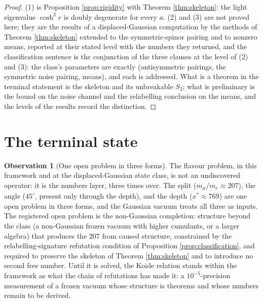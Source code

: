 \documentclass[11pt]{article}
\theoremstyle{definition}
\newtheorem{observation}[theorem]{Observation}
\begin{document}
\begin{proof}
(1) is Proposition \ref{prop:rigidity} with Theorem \ref{thm:skeleton}: the light eigenvalue $\cosh^{2}r$ is doubly degenerate for every $a$. (2) and (3) are not proved here; they are the results of a displaced-Gaussian computation by the methods of Theorem \ref{thm:skeleton} extended to the symmetric-spinor pairing and to nonzero means, reported at their stated level with the numbers they returned, and the classification sentence is the conjunction of the three clauses at the level of (2) and (3): the class's parameters are exactly (antisymmetric pairings, the symmetric noise pairing, means), and each is addressed. What is a theorem in the terminal statement is the skeleton and its unbreakable $S_{2}$; what is preliminary is the bound on the noise channel and the relabelling conclusion on the means, and the levels of the results record the distinction.
\end{proof}

\section{The terminal state}\label{sec:terminal}

\begin{observation}[One open problem in three forms]\label{obs:debt}
The flavour problem, in this framework and at the displaced-Gaussian state class, is not an undiscovered operator: it is the numbers layer, three times over. The split ($m_{\mu}/m_{e} \approx 207$), the angle ($45^{\circ}$, present only through the depth), and the depth ($x^{*} \approx 769$) are one open problem in three forms, and the Gaussian vacuum treats all three as inputs. The registered open problem is the non-Gaussian completion: structure beyond the class (a non-Gaussian frozen vacuum with higher cumulants, or a larger algebra) that produces the $207$ from caused structure, constrained by the relabelling-signature refutation condition of Proposition \ref{prop:classification}, and required to preserve the skeleton of Theorem \ref{thm:skeleton} and to introduce no second free number. Until it is solved, the Koide relation stands within the framework as what the chain of refutations has made it: a $10^{-5}$-precision measurement of a frozen vacuum whose structure is theorems and whose numbers remain to be derived.
\end{observation}
\end{document}
